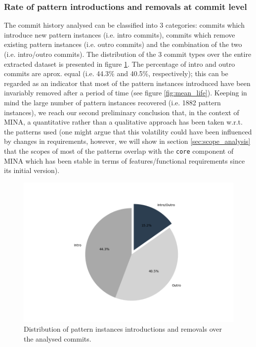 \subsubsection{Rate of pattern introductions and removals at commit level}
The commit history analysed can be classified into 3 categories: commits which introduce new pattern instances (i.e. intro commits), commits which remove existing pattern instances (i.e. outro commits) and the combination of the two (i.e. intro/outro commits). The distribution of the 3 commit types over the entire extracted dataset is presented in figure \ref{fig:pattern_commit_percentage}. The percentage of intro and outro commits are aprox. equal (i.e. 44.3\% and 40.5\%, respectively); this can be regarded as an indicator that most of the pattern instances introduced have been invariably removed after a period of time (see figure \ref{fig:mean_life}). Keeping in mind the large number of pattern instances recovered (i.e. 1882 pattern instances), we reach our second preliminary conclusion that, in the context of MINA, a quantitative rather than a qualitative approach has been taken w.r.t. the patterns used (one might argue that this volatility could have been influenced by changes in requirements, however, we will show in section \ref{sec:scope_analysis} that the scopes of most of the patterns overlap with the \texttt{core} component of MINA which has been stable in terms of features/functional requirements since its initial version).  
\begin{figure}[H]
    \centering
    \includegraphics[width =\textwidth]{images/graphs/intro_outro_per.png}
    \caption{Distribution of pattern instances introductions and removals over the analysed commits.}
    \label{fig:pattern_commit_percentage}
\end{figure}
